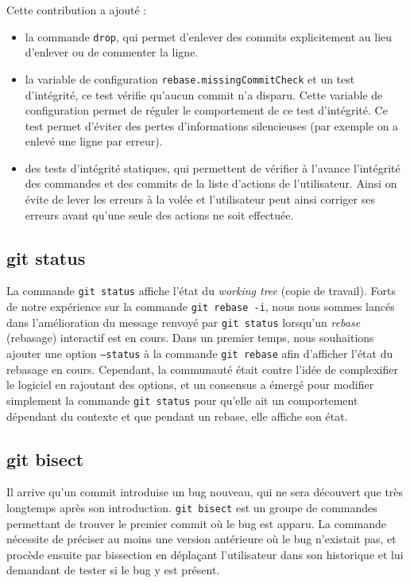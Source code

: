 \documentclass[a4paper, 12pt]{article}
\newcommand{\gitcmd}[1]{\texttt{#1}}
\begin{document}
Cette contribution a ajouté :
\begin{itemize}
\item la commande \gitcmd{drop}, qui permet d'enlever des commits explicitement au lieu d'enlever ou de commenter la ligne.
\item la variable de configuration \gitcmd{rebase.missingCommitCheck} et un test d'intégrité, ce test vérifie qu'aucun commit n'a disparu. Cette variable de configuration permet de réguler le comportement de ce test d'intégrité. Ce test permet d'éviter des pertes d'informations silencieuses (par exemple on a enlevé une ligne par erreur).
\item des tests d'intégrité statiques, qui permettent de vérifier à l'avance l'intégrité des commandes et des commits de la liste d'actions de l'utilisateur. Ainsi on évite de lever les erreurs à la volée et l'utilisateur peut ainsi corriger ses erreurs avant qu'une seule des actions ne soit effectuée.
\end{itemize}

\subsection{git status}

La commande \gitcmd{git status} affiche l'état du \textit{working tree} (copie de travail).
Forts de notre expérience sur la commande \gitcmd{git rebase -i}, nous nous sommes lancés dans l'amélioration du message renvoyé par \gitcmd{git status} lorsqu'un \textit{rebase} (rebasage) interactif est en cours.
Dans un premier temps, nous souhaitions ajouter une option \gitcmd{--status} à la commande \gitcmd{git rebase} afin d'afficher l'état du rebasage en cours. 
Cependant, la communauté était contre l'idée de complexifier le logiciel en rajoutant des options, et un consensus a émergé pour modifier simplement la commande \gitcmd{git status} pour qu'elle ait un comportement dépendant du contexte et que pendant un rebase, elle affiche son état.

\subsection{git bisect}

Il arrive qu'un commit introduise un bug nouveau, qui ne sera découvert que très longtemps après son introduction. \gitcmd{git bisect} est un groupe de commandes permettant de trouver le premier commit où le bug est apparu. La commande nécessite de préciser au moins une version antérieure où le bug n'existait pas, et procède ensuite par bissection en déplaçant l'utilisateur dans son historique et lui demandant de tester si le bug y est présent.
\end{document}
